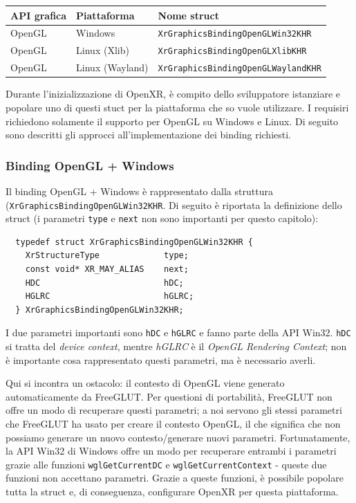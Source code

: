 \documentclass[twoside]{supsistudent}
\begin{document}
\begin{center}
  \begin{tabular}{ l l l }
    API grafica & Piattaforma & Nome struct \\
    \hline
    OpenGL      & Windows         & \texttt{XrGraphicsBindingOpenGLWin32KHR} \\
    OpenGL      & Linux (Xlib)    & \texttt{XrGraphicsBindingOpenGLXlibKHR} \\
    OpenGL      & Linux (Wayland) & \texttt{XrGraphicsBindingOpenGLWaylandKHR}
  \end{tabular}
\end{center}

Durante l'inizializzazione di OpenXR, è compito dello sviluppatore istanziare e popolare uno di questi stuct per la piattaforma che so vuole utilizzare. I requisiri richiedono solamente il supporto per OpenGL su Windows e Linux. Di seguito sono descritti gli approcci all'implementazione dei binding richiesti.

\subsubsection{Binding OpenGL + Windows}

Il binding OpenGL + Windows è rappresentato dalla struttura (\texttt{XrGraphicsBindingOpenGLWin32KHR}. Di seguito è riportata la definizione dello struct (i parametri \texttt{type} e \texttt{next} non sono importanti per questo capitolo):

\begin{verbatim}
  typedef struct XrGraphicsBindingOpenGLWin32KHR {
    XrStructureType             type;
    const void* XR_MAY_ALIAS    next;
    HDC                         hDC;
    HGLRC                       hGLRC;
  } XrGraphicsBindingOpenGLWin32KHR;
\end{verbatim}

I due parametri importanti sono \texttt{hDC} e \texttt{hGLRC} e fanno parte della API Win32. \texttt{hDC} si tratta del \textit{device context}, mentre \textit{hGLRC} è il \textit{OpenGL Rendering Context}; non è importante cosa rappresentato questi parametri, ma è necessario averli.

Qui si incontra un ostacolo: il contesto di OpenGL viene generato automaticamente da FreeGLUT. Per questioni di portabilità, FreeGLUT non offre un modo di recuperare questi parametri; a noi servono gli stessi parametri che FreeGLUT ha usato per creare il contesto OpenGL, il che significa che non possiamo generare un nuovo contesto/generare nuovi parametri. Fortunatamente, la API Win32 di Windows offre un modo per recuperare entrambi i parametri grazie alle funzioni \texttt{wglGetCurrentDC} e \texttt{wglGetCurrentContext} - queste due funzioni non accettano parametri. Grazie a queste funzioni, è possibile popolare tutta la struct e, di conseguenza, configurare OpenXR per questa piattaforma.
\end{document}
